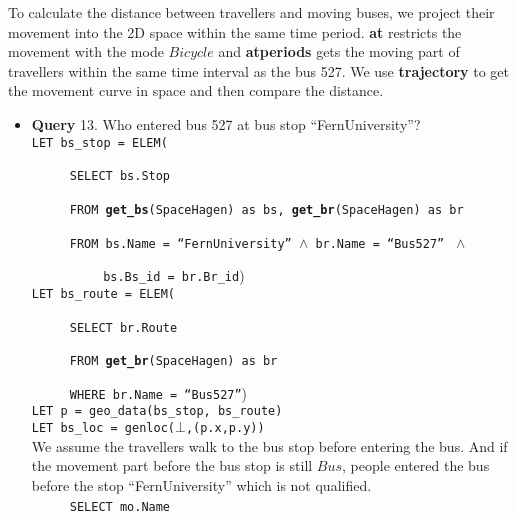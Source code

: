 To calculate the distance between travellers and moving buses, we project their movement into the 2D space within the same time period. \textbf{at} restricts the movement with the mode $Bicycle$ and \textbf{atperiods} gets the moving part of travellers within the same time interval as the bus 527. We use \textbf{trajectory} to get the movement curve in space and then compare the distance. \\


\begin{itemize}
 \item \textbf{Query} 13. Who entered bus 527 at bus stop ``FernUniversity''? \\

\texttt{LET bs\_stop = ELEM(} 

$\hspace{1cm}$ \texttt{SELECT bs.Stop}

$\hspace{1cm}$ \texttt{FROM \textbf{get\_bs}(SpaceHagen) as bs, \textbf{get\_br}(SpaceHagen) as br}

$\hspace{1cm}$ \texttt{FROM bs.Name = ``FernUniversity'' $\wedge$ 
br.Name = ``Bus527'' } $\wedge$ 

$\hspace{2cm}$ \texttt{bs.Bs\_id = br.Br\_id})  \\


\texttt{LET bs\_route = ELEM(} 

$\hspace{1cm}$ \texttt{SELECT br.Route}

$\hspace{1cm}$ \texttt{FROM \textbf{get\_br}(SpaceHagen) as br}

$\hspace{1cm}$ \texttt{WHERE br.Name = ``Bus527''}) \\


\texttt{LET p = geo\_data(bs\_stop, bs\_route)} \\


\texttt{LET bs\_loc = genloc($\bot$,(p.x,p.y))}  \\


We assume the travellers walk to the bus stop before entering the bus. And if the movement part before the bus stop is still $Bus$, people entered the bus before the stop ``FernUniversity'' which is not qualified. \\


$\hspace{1cm}$ \texttt{SELECT mo.Name}


\end{itemize}
